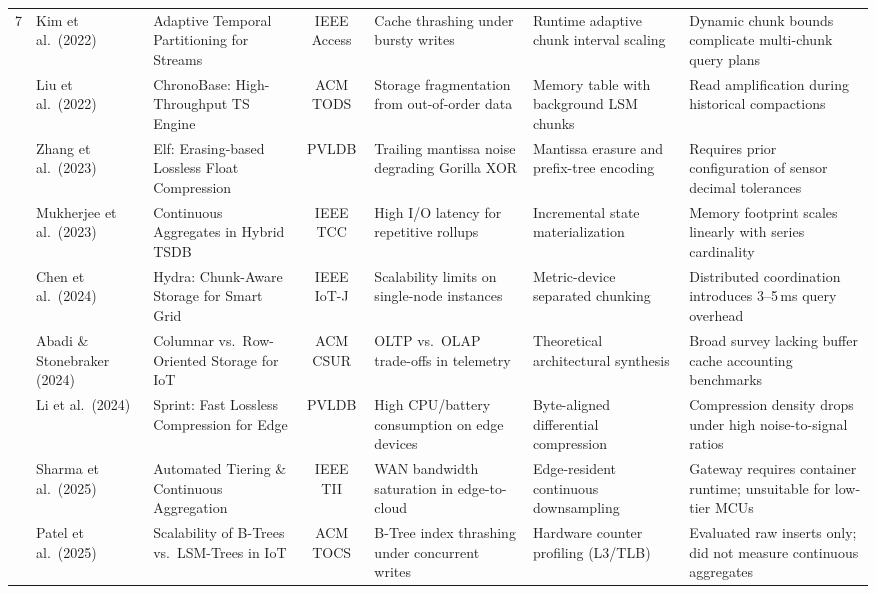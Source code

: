 \documentclass[conference,a4paper]{IEEEtran}
\begin{document}
\begin{table}[t]
\begin{tabularx}{\textwidth}{@{}c p{2.5cm} p{3.2cm} c p{2.8cm} p{2.5cm} X@{}}
7 & Kim et al.\ (2022)~\cite{kim2022adaptive} & Adaptive Temporal Partitioning for Streams & IEEE Access & Cache thrashing under bursty writes & Runtime adaptive chunk interval scaling & Dynamic chunk bounds complicate multi-chunk query plans \\ \addlinespace[0.4ex]
8 & Liu et al.\ (2022)~\cite{liu2022chronobase} & ChronoBase: High-Throughput TS Engine & ACM TODS & Storage fragmentation from out-of-order data & Memory table with background LSM chunks & Read amplification during historical compactions \\ \addlinespace[0.4ex]
9 & Zhang et al.\ (2023)~\cite{zhang2023elf} & Elf: Erasing-based Lossless Float Compression & PVLDB & Trailing mantissa noise degrading Gorilla XOR & Mantissa erasure and prefix-tree encoding & Requires prior configuration of sensor decimal tolerances \\ \addlinespace[0.4ex]
10 & Mukherjee et al.\ (2023)~\cite{mukherjee2023continuous} & Continuous Aggregates in Hybrid TSDB & IEEE TCC & High I/O latency for repetitive rollups & Incremental state materialization & Memory footprint scales linearly with series cardinality \\ \addlinespace[0.4ex]
11 & Chen et al.\ (2024)~\cite{chen2024hydra} & Hydra: Chunk-Aware Storage for Smart Grid & IEEE IoT-J & Scalability limits on single-node instances & Metric-device separated chunking & Distributed coordination introduces 3--5\,ms query overhead \\ \addlinespace[0.4ex]
12 & Abadi \& Stonebraker (2024)~\cite{abadi2024columnar} & Columnar vs.\ Row-Oriented Storage for IoT & ACM CSUR & OLTP vs.\ OLAP trade-offs in telemetry & Theoretical architectural synthesis & Broad survey lacking buffer cache accounting benchmarks \\ \addlinespace[0.4ex]
13 & Li et al.\ (2024)~\cite{li2024sprint} & Sprint: Fast Lossless Compression for Edge & PVLDB & High CPU/battery consumption on edge devices & Byte-aligned differential compression & Compression density drops under high noise-to-signal ratios \\ \addlinespace[0.4ex]
14 & Sharma et al.\ (2025)~\cite{sharma2025automated} & Automated Tiering \& Continuous Aggregation & IEEE TII & WAN bandwidth saturation in edge-to-cloud & Edge-resident continuous downsampling & Gateway requires container runtime; unsuitable for low-tier MCUs \\ \addlinespace[0.4ex]
15 & Patel et al.\ (2025)~\cite{patel2025empirical} & Scalability of B-Trees vs.\ LSM-Trees in IoT & ACM TOCS & B-Tree index thrashing under concurrent writes & Hardware counter profiling (L3/TLB) & Evaluated raw inserts only; did not measure continuous aggregates \\ \bottomrule
\end{tabularx}
\end{table}
\end{document}
